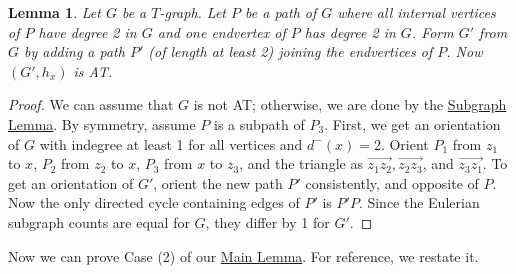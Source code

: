 \documentclass[12pt]{article}
\theoremstyle{plain}
\newtheorem{lem}[thm]{Lemma}
\theoremstyle{definition}
\theoremstyle{remark}
\renewcommand{\vec}{\overrightarrow}
\begin{document}
	\begin{lem}\label{AddPathReducible}
		Let $G$ be a $T$-graph. Let $P$ be a path of $G$ where all internal
		vertices of $P$ have degree 2 in $G$ and one endvertex of $P$ has degree 2 in
		$G$.  Form $G'$ from $G$ by adding a path $P'$ (of length at least 2) joining
		the endvertices of $P$.  Now $(G', h_x)$ is AT.
	\end{lem}
	\begin{proof}
		We can assume that $G$ is not AT; otherwise, we are done by the
		\hyperlink{target:InducedSubgraph}{Subgraph Lemma}.  By symmetry, assume $P$ is a
		subpath of $P_3$. First, we get an orientation of $G$ with indegree at least 1
		for all vertices and $d^-(x) = 2$. Orient $P_1$ from $z_1$ to $x$, $P_2$ from
		$z_2$ to $x$, $P_3$ from $x$ to $z_3$, and the triangle as $\vec{z_1z_2},
		\vec{z_2z_3}$, and $\vec{z_3z_1}$.  To get an orientation of $G'$, orient the
		new path $P'$ consistently, and opposite of $P$.  Now the only directed cycle
		containing edges of $P'$ is $P'P$.  Since the Eulerian subgraph counts are
		equal for $G$, they differ by 1 for $G'$. 
	\end{proof}
	
	Now we can prove Case (2) of our \hyperlink{target:mainLemma}{Main Lemma}.  For
	reference, we restate it.
	
	
	
\end{document}
